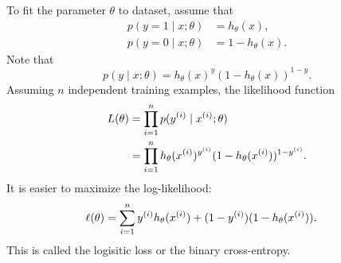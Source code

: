 \documentclass[a4paper]{article}
\begin{document}
To fit the parameter $\theta$ to dataset, assume that 
\[
\begin{aligned}
  p(y = 1 \mid x ; \theta) &= h_\theta(x), \\
  p(y = 0 \mid x ; \theta) &= 1 - h_\theta(x).
\end{aligned}
\]
Note that 
\[
p(y \mid x; \theta) = h_\theta(x)^y (1 - h_\theta(x))^{1 - y}.
\]
Assuming $n$ independent training examples, the likelihood 
function 
\[
\begin{aligned}
  L(\theta) &= \prod_{i=1}^n p(y^{(i)} \mid x^{(i)} ; \theta) \\
  &= \prod_{i=1}^n h_\theta(x^{(i)})^{y^{(i)}} (1 - h_\theta(x^{(i)}))^{1 - y^{(i)}}.
\end{aligned}
\]
It is easier to maximize the log-likelihood: 
\[
\begin{aligned}
  \ell(\theta) &= \sum_{i=1}^n 
  y^{(i)} h_\theta(x^{(i)}) + (1 - y^{(i)}) (1 - h_\theta(x^{(i)})).
\end{aligned}
\]
This is called the logisitic loss or the binary cross-entropy.
\end{document}
